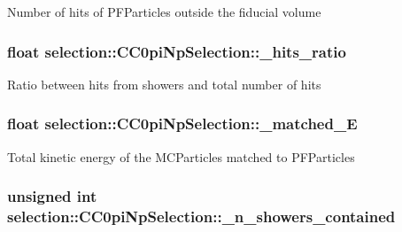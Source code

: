 Number of hits of P\-F\-Particles outside the fiducial volume \hypertarget{classselection_1_1CC0piNpSelection_a32b43003c9168115bc94544049e439a2}{
\subsubsection[{\-\_\-hits\-\_\-ratio}]{\setlength{\rightskip}{0pt plus 5cm}float selection\-::\-C\-C0pi\-Np\-Selection\-::\-\_\-hits\-\_\-ratio\hspace{0.3cm}{\ttfamily [private]}}}\label{classselection_1_1CC0piNpSelection_a32b43003c9168115bc94544049e439a2}
Ratio between hits from showers and total number of hits \hypertarget{classselection_1_1CC0piNpSelection_ac75aa3ac33061bbdd378594ee7e6e2e5}{
\subsubsection[{\-\_\-matched\-\_\-\-E}]{\setlength{\rightskip}{0pt plus 5cm}float selection\-::\-C\-C0pi\-Np\-Selection\-::\-\_\-matched\-\_\-\-E\hspace{0.3cm}{\ttfamily [private]}}}\label{classselection_1_1CC0piNpSelection_ac75aa3ac33061bbdd378594ee7e6e2e5}
Total kinetic energy of the M\-C\-Particles matched to P\-F\-Particles \hypertarget{classselection_1_1CC0piNpSelection_aebf4a69b8d7f3171ad90c382668c22ec}{
\subsubsection[{\-\_\-n\-\_\-showers\-\_\-contained}]{\setlength{\rightskip}{0pt plus 5cm}unsigned int selection\-::\-C\-C0pi\-Np\-Selection\-::\-\_\-n\-\_\-showers\-\_\-contained\hspace{0.3cm}{\ttfamily [private]}}}\label{classselection_1_1CC0piNpSelection_aebf4a69b8d7f3171ad90c382668c22ec}
